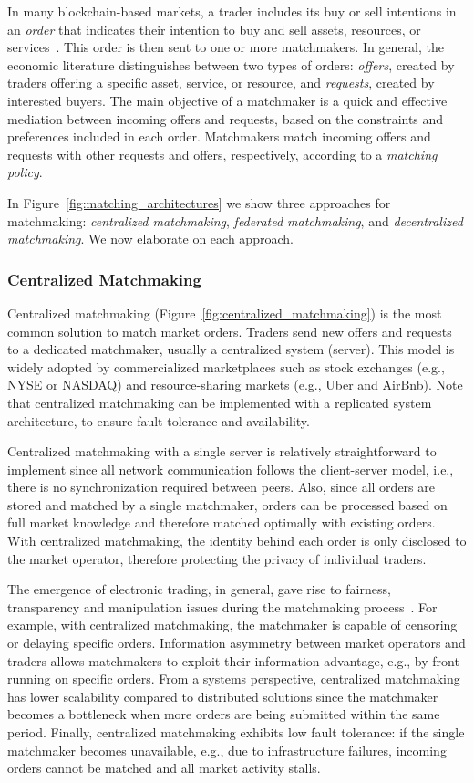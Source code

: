 In many blockchain-based markets, a trader includes its buy or sell intentions in an \emph{order} that indicates their intention to buy and sell assets, resources, or services~\cite{veit2003matchmaking}.
This order is then sent to one or more matchmakers.
In general, the economic literature distinguishes between two types of orders: \emph{offers}, created by traders offering a specific asset, service, or resource, and \emph{requests}, created by interested buyers.
The main objective of a matchmaker is a quick and effective mediation between incoming offers and requests, based on the constraints and preferences included in each order.
Matchmakers match incoming offers and requests with other requests and offers, respectively, according to a \emph{matching policy}.

In Figure~\ref{fig:matching_architectures} we show three approaches for matchmaking: \emph{centralized matchmaking}, \emph{federated matchmaking}, and \emph{decentralized matchmaking}.
We now elaborate on each approach.

\subsubsection{Centralized Matchmaking}
Centralized matchmaking (Figure~\ref{fig:centralized_matchmaking}) is the most common solution to match market orders.
Traders send new offers and requests to a dedicated matchmaker, usually a centralized system (server).
This model is widely adopted by commercialized marketplaces such as stock exchanges (e.g., NYSE or NASDAQ) and resource-sharing markets (e.g., Uber and AirBnb).
Note that centralized matchmaking can be implemented with a replicated system architecture, to ensure fault tolerance and availability.

Centralized matchmaking with a single server is relatively straightforward to implement since all network communication follows the client-server model, i.e., there is no synchronization required between peers.
Also, since all orders are stored and matched by a single matchmaker, orders can be processed based on full market knowledge and therefore matched optimally with existing orders.
With centralized matchmaking, the identity behind each order is only disclosed to the market operator, therefore protecting the privacy of individual traders.

The emergence of electronic trading, in general, gave rise to fairness, transparency and manipulation issues during the matchmaking process~\cite{mavroudis2019libra}.
For example, with centralized matchmaking, the matchmaker is capable of censoring or delaying specific orders.
Information asymmetry between market operators and traders allows matchmakers to exploit their information advantage, e.g., by front-running on specific orders.
From a systems perspective, centralized matchmaking has lower scalability compared to distributed solutions since the matchmaker becomes a bottleneck when more orders are being submitted within the same period.
Finally, centralized matchmaking exhibits low fault tolerance: if the single matchmaker becomes unavailable, e.g., due to infrastructure failures, incoming orders cannot be matched and all market activity stalls.

